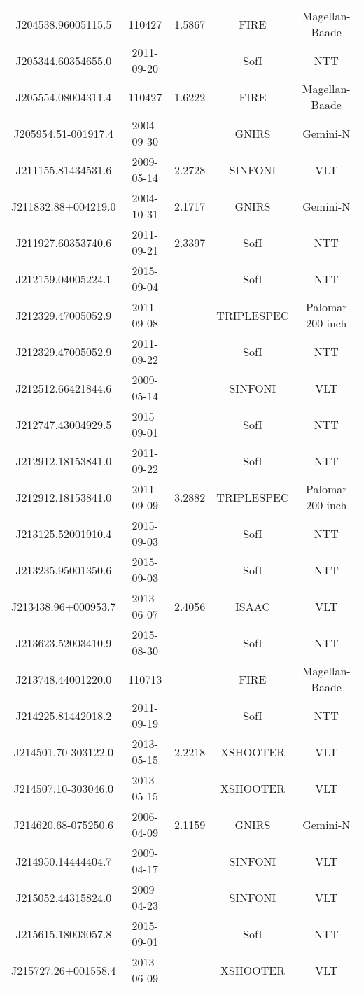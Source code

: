 {\begin{longtable}{ccccc}
J204538.96005115.5 & 110427 & 1.5867 & FIRE & Magellan-Baade \\
J205344.60354655.0 & 2011-09-20 &  & SofI & NTT \\
J205554.08004311.4 & 110427 & 1.6222 & FIRE & Magellan-Baade \\
J205954.51-001917.4 & 2004-09-30 &  & GNIRS & Gemini-N \\
J211155.81434531.6 & 2009-05-14 & 2.2728 & SINFONI & VLT \\
J211832.88+004219.0 & 2004-10-31 & 2.1717 & GNIRS & Gemini-N \\
J211927.60353740.6 & 2011-09-21 & 2.3397 & SofI & NTT \\
J212159.04005224.1 & 2015-09-04 &  & SofI & NTT \\
J212329.47005052.9 & 2011-09-08 &  & TRIPLESPEC & Palomar 200-inch \\
J212329.47005052.9 & 2011-09-22 &  & SofI & NTT \\
J212512.66421844.6 & 2009-05-14 &  & SINFONI & VLT \\
J212747.43004929.5 & 2015-09-01 &  & SofI & NTT \\
J212912.18153841.0 & 2011-09-22 &  & SofI & NTT \\
J212912.18153841.0 & 2011-09-09 & 3.2882 & TRIPLESPEC & Palomar 200-inch \\
J213125.52001910.4 & 2015-09-03 &  & SofI & NTT \\
J213235.95001350.6 & 2015-09-03 &  & SofI & NTT \\
J213438.96+000953.7 & 2013-06-07 & 2.4056 & ISAAC & VLT \\
J213623.52003410.9 & 2015-08-30 &  & SofI & NTT \\
J213748.44001220.0 & 110713 &  & FIRE & Magellan-Baade \\
J214225.81442018.2 & 2011-09-19 &  & SofI & NTT \\
J214501.70-303122.0 & 2013-05-15 & 2.2218 & XSHOOTER & VLT \\
J214507.10-303046.0 & 2013-05-15 &  & XSHOOTER & VLT \\
J214620.68-075250.6 & 2006-04-09 & 2.1159 & GNIRS & Gemini-N \\
J214950.14444404.7 & 2009-04-17 &  & SINFONI & VLT \\
J215052.44315824.0 & 2009-04-23 &  & SINFONI & VLT \\
J215615.18003057.8 & 2015-09-01 &  & SofI & NTT \\
J215727.26+001558.4 & 2013-06-09 &  & XSHOOTER & VLT \\

\end{longtable}}
